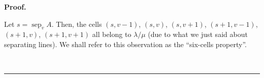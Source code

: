 \documentclass[numbers=enddot,12pt,final,onecolumn,notitlepage]{scrartcl}%
\theoremstyle{definition}
\newenvironment{proof}[1][Proof]{\noindent\textbf{#1.} }{\ \rule{0.5em}{0.5em}}
\def\lm{{\lambda/\mu}}
\begin{document}
\begin{proof}
%

Let $s=\operatorname*{sep}\nolimits_{v}A$.
Then, the cells
$\left(s, v-1\right)$, $\left(s, v\right)$, $\left(s, v+1\right)$,
$\left(s+1, v-1\right)$, $\left(s+1, v\right)$, $\left(s+1, v+1\right)$
all belong to $\lm$ (due to what we just said about separating
lines). We shall refer to this observation as the
``six-cells property''.


\end{proof}
\end{document}
